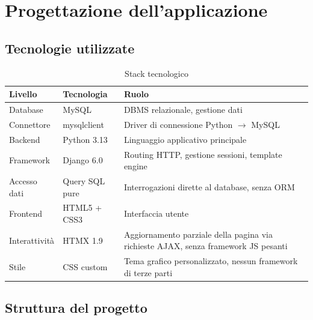 \chapter{Progettazione dell'applicazione}

\section{Tecnologie utilizzate}

\begin{table}[H]
  \centering
  \caption{Stack tecnologico}
  \label{tab:stack}
  \begin{tabularx}{\textwidth}{L{3cm} L{3.5cm} L{8.2cm}}
    \toprule
    \textbf{Livello} & \textbf{Tecnologia} & \textbf{Ruolo} \\
    \midrule
    Database     & MySQL            & DBMS relazionale, gestione dati \\
    Connettore   & mysqlclient      & Driver di connessione Python $\rightarrow$ MySQL \\
    Backend      & Python 3.13      & Linguaggio applicativo principale \\
    Framework    & Django 6.0       & Routing HTTP, gestione sessioni, template engine \\
    Accesso dati & Query SQL pure   & Interrogazioni dirette al database, senza ORM \\
    Frontend     & HTML5 + CSS3     & Interfaccia utente \\
    Interattivit\`{a} & HTMX 1.9    & Aggiornamento parziale della pagina via richieste AJAX, senza framework JS pesanti \\
    Stile        & CSS custom       & Tema grafico personalizzato, nessun framework di terze parti \\
    \bottomrule
  \end{tabularx}
\end{table}

\clearpage

\section{Struttura del progetto}

